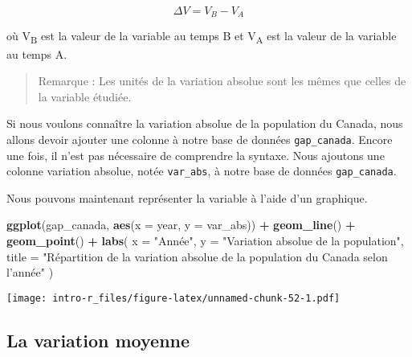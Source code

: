 \documentclass[]{book}
\newenvironment{Shaded}{\begin{snugshade}}{\end{snugshade}}
\newcommand{\KeywordTok}[1]{\textcolor[rgb]{0.13,0.29,0.53}{\textbf{#1}}}
\newcommand{\DataTypeTok}[1]{\textcolor[rgb]{0.13,0.29,0.53}{#1}}
\newcommand{\StringTok}[1]{\textcolor[rgb]{0.31,0.60,0.02}{#1}}
\newcommand{\OperatorTok}[1]{\textcolor[rgb]{0.81,0.36,0.00}{\textbf{#1}}}
\newcommand{\NormalTok}[1]{#1}
\begin{document}
\begin{equation}
\Delta V = V_B - V_A
\end{equation}

où V\textsubscript{B} est la valeur de la variable au temps B et
V\textsubscript{A} est la valeur de la variable au temps A.

\begin{quote}
Remarque : Les unités de la variation absolue sont les mêmes que celles
de la variable étudiée.
\end{quote}

Si nous voulons connaître la variation absolue de la population du
Canada, nous allons devoir ajouter une colonne à notre base de données
\texttt{gap\_canada}. Encore une fois, il n'est pas nécessaire de
comprendre la syntaxe. Nous ajoutons une colonne variation absolue,
notée \texttt{var\_abs}, à notre base de données \texttt{gap\_canada}.

\begin{Shaded}
\end{Shaded}

Nous pouvons maintenant représenter la variable à l'aide d'un graphique.

\begin{Shaded}
\begin{Highlighting}[]
\KeywordTok{ggplot}\NormalTok{(gap_canada, }\KeywordTok{aes}\NormalTok{(}\DataTypeTok{x =}\NormalTok{ year, }\DataTypeTok{y =}\NormalTok{ var_abs)) }\OperatorTok{+}
\StringTok{  }\KeywordTok{geom_line}\NormalTok{() }\OperatorTok{+}
\StringTok{  }\KeywordTok{geom_point}\NormalTok{() }\OperatorTok{+}
\StringTok{  }\KeywordTok{labs}\NormalTok{(}
    \DataTypeTok{x =} \StringTok{"Année"}\NormalTok{,}
    \DataTypeTok{y =} \StringTok{"Variation absolue de la population"}\NormalTok{,}
    \DataTypeTok{title =} \StringTok{"Répartition de la variation absolue de la population du Canada selon l'année"}
\NormalTok{  )}
\end{Highlighting}
\end{Shaded}

\texttt{[image: intro-r\_files/figure-latex/unnamed-chunk-52-1.pdf]}

\subsection{La variation moyenne}\label{la-variation-moyenne}
\end{document}

